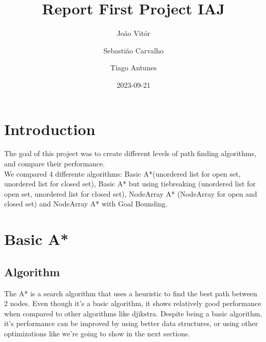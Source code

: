 \documentclass{article}
\title{Report First Project IAJ}
\author{João Vitór
  \and Sebastião Carvalho
  \and Tiago Antunes}
\date{2023-09-21}
\begin{document}
  \maketitle
  \tableofcontents
  \section{Introduction}
  The goal of this project was to create different levels of path finding algorithms, and compare their performance.\\
  We compared 4 differente algorithms: Basic A*(unordered list for open set, unordered list for closed set), Basic A* but using tiebreaking 
  (unordered list for open set, unordered list for closed set), NodeArray A* (NodeArray for open and closed set) 
  and NodeArray A* with Goal Bounding.\\
  \newpage
  \section{Basic A*}
  \subsection{Algorithm}
  The A* is a search algorithm that uses a heuristic to find the best path between 2 nodes. Even though it's a basic algorithm, it shows relatively good 
  performance when compared to other algorithms like djikstra. Despite being a basic algorithm, it's performance can be improved by using better data structures,
  or using other optimizations like we're going to show in the next sections.\\
\end{document}
